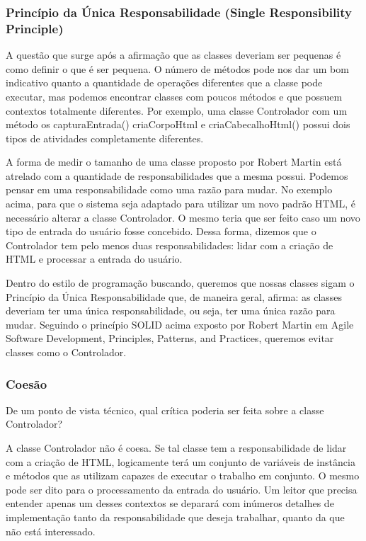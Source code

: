\subsubsection{Princípio da Única Responsabilidade (Single Responsibility Principle)}
A questão que surge após a afirmação que as classes deveriam ser pequenas é como definir o que é ser pequena. O número de métodos pode nos dar um bom indicativo quanto a quantidade de operações diferentes que a classe pode executar, mas podemos encontrar classes com poucos métodos e que possuem contextos totalmente diferentes. Por exemplo, uma classe Controlador com um método os capturaEntrada() criaCorpoHtml e criaCabecalhoHtml() possui dois tipos de atividades completamente diferentes.
	
A forma de medir o tamanho de uma classe proposto por Robert Martin está atrelado com a quantidade de responsabilidades que a mesma possui. Podemos pensar em uma responsabilidade como uma razão para mudar. No exemplo acima, para que o sistema seja adaptado para utilizar um novo padrão HTML, é necessário alterar a classe Controlador. O mesmo teria que ser feito caso um novo tipo de entrada do usuário fosse concebido. Dessa forma, dizemos que o Controlador tem pelo menos duas responsabilidades: lidar com a criação de HTML e processar a entrada do usuário.
	
Dentro do estilo de programação buscando, queremos que nossas classes sigam o Princípio da Única Responsabilidade que, de maneira geral, afirma: as classes deveriam ter uma única responsabilidade, ou seja, ter uma única razão para mudar. Seguindo o princípio SOLID acima exposto por Robert Martin em Agile Software Development, Principles, Patterns, and Practices, queremos evitar classes como o Controlador.

\subsubsection{Coesão}
De um ponto de vista técnico, qual crítica poderia ser feita sobre a classe Controlador? 
	
A classe Controlador não é coesa. Se tal classe tem a responsabilidade de lidar com a criação de HTML, logicamente terá um conjunto de variáveis de instância e métodos que as utilizam capazes de executar o trabalho em conjunto. O mesmo pode ser dito para o processamento da entrada do usuário. Um leitor que precisa entender apenas um desses contextos se deparará com inúmeros detalhes de implementação tanto da responsabilidade que deseja trabalhar, quanto da que não está interessado.
	
